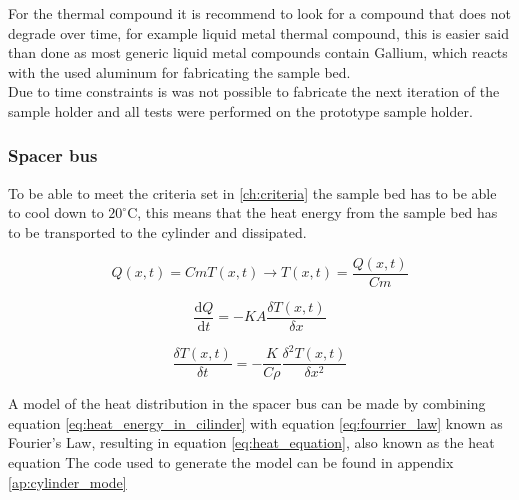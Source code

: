 \documentclass[10pt]{article}
\begin{document}
For the thermal compound it is recommend to look for a compound that does not degrade over time, for example liquid metal thermal compound, this is easier said than done as most generic liquid metal compounds contain Gallium, which reacts with the used aluminum for fabricating the sample bed.\\

Due to time constraints is was not possible to fabricate the next iteration of the sample holder and all tests were performed on the prototype sample holder.\\


\subsubsection{Spacer bus}


To be able to meet the criteria set in \ref{ch:criteria} the sample bed has to be able to cool down to $20^\circ$C, this means that the heat energy from the sample bed has to be transported to the cylinder and dissipated.



\begin{equation}
  Q(x,t) = CmT(x, t) \rightarrow T(x,t) = \frac{Q(x, t)}{Cm}
  \label{eq:heat_energy_in_cilinder}
\end{equation}

\begin{equation}
  \frac{\mathrm{d}Q}{\mathrm{d}t} = -KA\frac{\delta T(x, t)}{\delta {x}}
  \label{eq:fourrier_law}
\end{equation}

\begin{equation}
  \frac{\delta{T(x,t)}}{\delta t} = -\frac{K}{C\rho}\frac{\delta^{2} T(x, t)}{\delta x^2}
  \label{eq:heat_equation}
\end{equation}

A model of the heat distribution in the spacer bus can be made by combining equation \ref{eq:heat_energy_in_cilinder} with equation \ref{eq:fourrier_law} known as Fourier's Law, resulting in equation \ref{eq:heat_equation}, also known as the heat equation 
The code used to generate the model can be found in appendix \ref{ap:cylinder_mode}
\end{document}
